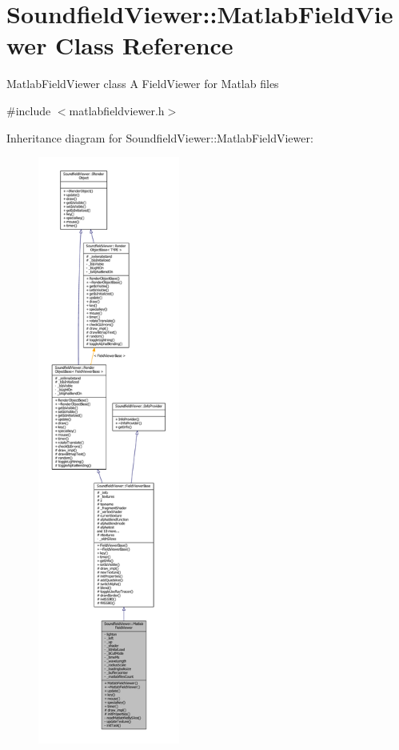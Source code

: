 \section{Soundfield\-Viewer\-:\-:Matlab\-Field\-Viewer Class Reference}
\label{classSoundfieldViewer_1_1MatlabFieldViewer}


Matlab\-Field\-Viewer class A Field\-Viewer for Matlab files  




{\ttfamily \#include $<$matlabfieldviewer.\-h$>$}



Inheritance diagram for Soundfield\-Viewer\-:\-:Matlab\-Field\-Viewer\-:\nopagebreak
\begin{figure}[H]
\begin{center}
\leavevmode
\includegraphics[height=550pt]{d6/d2f/classSoundfieldViewer_1_1MatlabFieldViewer__inherit__graph}
\end{center}
\end{figure}


